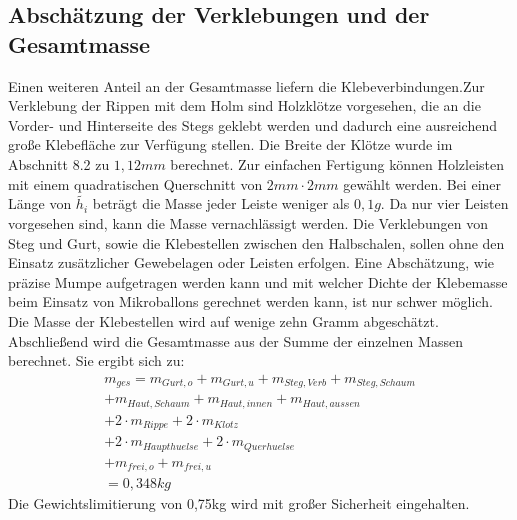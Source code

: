 \subsection{Abschätzung der Verklebungen und der Gesamtmasse}
Einen weiteren Anteil an der Gesamtmasse liefern die Klebeverbindungen.Zur Verklebung der Rippen mit dem Holm sind Holzklötze vorgesehen, die an die Vorder- und Hinterseite des Stegs geklebt werden und dadurch eine ausreichend große Klebefläche zur Verfügung stellen. Die Breite der Klötze wurde im Abschnitt 8.2 zu $ 1,12mm $ berechnet. Zur einfachen Fertigung können Holzleisten mit einem quadratischen Querschnitt von $ 2mm\cdot2mm $ gewählt werden. Bei einer Länge von $ \tilde{h_{i}} $ beträgt die Masse jeder Leiste weniger als $ 0,1g $. Da nur vier Leisten vorgesehen sind, kann die Masse vernachlässigt werden. Die Verklebungen von Steg und Gurt, sowie die Klebestellen zwischen den Halbschalen, sollen ohne den Einsatz zusätzlicher Gewebelagen oder Leisten erfolgen. Eine Abschätzung, wie präzise Mumpe aufgetragen werden kann und mit welcher Dichte der Klebemasse beim Einsatz von Mikroballons gerechnet werden kann, ist nur schwer möglich. Die Masse der Klebestellen wird auf wenige zehn Gramm abgeschätzt.\\

\noindent Abschließend wird die Gesamtmasse aus der Summe der einzelnen Massen berechnet. Sie ergibt sich zu:
\begin{equation}
\begin{array}{l}
	m_{ges}= m_{Gurt,o}+m_{Gurt,u}+m_{Steg,Verb}+m_{Steg,Schaum} \\ +m_{Haut,Schaum}+m_{Haut,innen}+m_{Haut,aussen} \\ +2\cdot m_{Rippe}+2\cdot m_{Klotz} \\
	+2\cdot m_{Haupthuelse}+2\cdot m_{Querhuelse}\\
	+m_{frei,o}+m_{frei,u}\\
	=0,348kg
\end{array}  
\end{equation}
Die Gewichtslimitierung von 0,75kg wird mit großer Sicherheit eingehalten.


